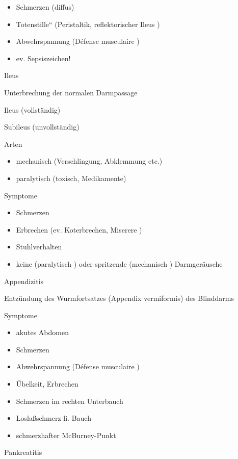 \documentclass{article}
\begin{document}
\begin{itemize}
\item Schmerzen (diffus)

\item {\quotedblbase}Totenstille{\textquotedblleft} (Peristaltik,
reflektorischer Ileus )

\item Abwehrspannung (D\'efense musculaire )

\item ev. Sepsiszeichen!

\end{itemize}
Ileus

Unterbrechung der normalen  Darmpassage

Ileus  (vollst\"andig)

Subileus  (unvollst\"andig)

Arten

\begin{itemize}
\item mechanisch  (Verschlingung, Abklemmung  etc.)

\item paralytisch  (toxisch, Medikamente)

\end{itemize}
Symptome

\begin{itemize}
\item Schmerzen

\item Erbrechen (ev. Koterbrechen, Miserere )

\item Stuhlverhalten

\item keine (paralytisch ) oder spritzende  (mechanisch )
Darmger\"ausche

\end{itemize}
Appendizitis

Entz\"undung des Wurmfortsatzes (Appendix vermiformis) des Blinddarms

Symptome

\begin{itemize}
\item akutes Abdomen

\item Schmerzen

\item Abwehrspannung (D\'efense musculaire )

\item \"Ubelkeit, Erbrechen

\item Schmerzen im rechten Unterbauch

\item Losla{\ss}schmerz li. Bauch

\item schmerzhafter McBurney-Punkt

\end{itemize}
Pankreatitis
\end{document}
